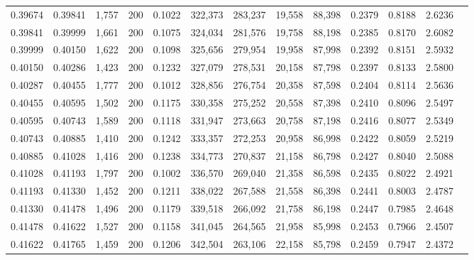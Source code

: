 \begin{tabular}{rrrrrrrrrrrrr}
0.39674 & 0.39841 &  1,757 & 200 &                                     0.1022 & 322,373 & 283,237 &  19,558 &  88,398 & 0.2379 & 0.8188 & 2.6236 \\
0.39841 & 0.39999 &  1,661 & 200 &                                     0.1075 & 324,034 & 281,576 &  19,758 &  88,198 & 0.2385 & 0.8170 & 2.6082 \\
0.39999 & 0.40150 &  1,622 & 200 &                                     0.1098 & 325,656 & 279,954 &  19,958 &  87,998 & 0.2392 & 0.8151 & 2.5932 \\
0.40150 & 0.40286 &  1,423 & 200 &                                     0.1232 & 327,079 & 278,531 &  20,158 &  87,798 & 0.2397 & 0.8133 & 2.5800 \\
0.40287 & 0.40455 &  1,777 & 200 &                                     0.1012 & 328,856 & 276,754 &  20,358 &  87,598 & 0.2404 & 0.8114 & 2.5636 \\
0.40455 & 0.40595 &  1,502 & 200 &                                     0.1175 & 330,358 & 275,252 &  20,558 &  87,398 & 0.2410 & 0.8096 & 2.5497 \\
0.40595 & 0.40743 &  1,589 & 200 &                                     0.1118 & 331,947 & 273,663 &  20,758 &  87,198 & 0.2416 & 0.8077 & 2.5349 \\
0.40743 & 0.40885 &  1,410 & 200 &                                     0.1242 & 333,357 & 272,253 &  20,958 &  86,998 & 0.2422 & 0.8059 & 2.5219 \\
0.40885 & 0.41028 &  1,416 & 200 &                                     0.1238 & 334,773 & 270,837 &  21,158 &  86,798 & 0.2427 & 0.8040 & 2.5088 \\
0.41028 & 0.41193 &  1,797 & 200 &                                     0.1002 & 336,570 & 269,040 &  21,358 &  86,598 & 0.2435 & 0.8022 & 2.4921 \\
0.41193 & 0.41330 &  1,452 & 200 &                                     0.1211 & 338,022 & 267,588 &  21,558 &  86,398 & 0.2441 & 0.8003 & 2.4787 \\
0.41330 & 0.41478 &  1,496 & 200 &                                     0.1179 & 339,518 & 266,092 &  21,758 &  86,198 & 0.2447 & 0.7985 & 2.4648 \\
0.41478 & 0.41622 &  1,527 & 200 &                                     0.1158 & 341,045 & 264,565 &  21,958 &  85,998 & 0.2453 & 0.7966 & 2.4507 \\
0.41622 & 0.41765 &  1,459 & 200 &                                     0.1206 & 342,504 & 263,106 &  22,158 &  85,798 & 0.2459 & 0.7947 & 2.4372 \\

\end{tabular}

